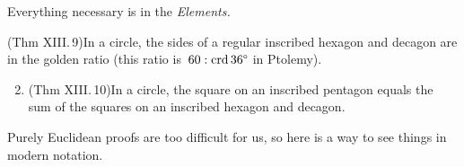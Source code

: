 \goodbreak




Everything necessary is in the \emph{Elements.}

\begin{thm*}{}{}
	\exstart (Thm XIII.\,9)\lstsp In a circle, the sides of a regular inscribed hexagon and decagon are in the golden ratio (this ratio is\ $60:\crd \ang{36}$ in Ptolemy).
	\begin{enumerate}\setcounter{enumi}{1}
	  \item (Thm XIII.\,10)\lstsp In a circle, the square on an inscribed pentagon equals the sum of the squares on an inscribed hexagon and decagon.
	\end{enumerate}
\end{thm*}

Purely Euclidean proofs are too difficult for us, so here is a way to see things in modern notation.

